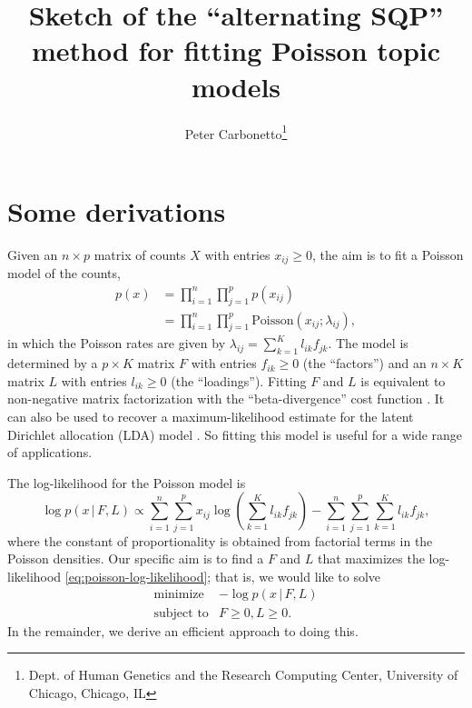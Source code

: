 \documentclass[final]{siamart171218}
\title{Sketch of the ``alternating SQP'' method for fitting Poisson
  topic models}
\author{Peter Carbonetto\thanks{Dept. of Human Genetics and the Research Computing Center, University of Chicago, Chicago, IL}}
\begin{document}
\maketitle

\section{Some derivations}

Given an $n \times p$ matrix of counts $X$ with entries $x_{ij} \geq
0$, the aim is to fit a Poisson model of the counts,
\begin{align}
p(x) &= \prod_{i=1}^n \prod_{j=1}^p p(x_{ij}) \nonumber \\
     &= \prod_{i=1}^n \prod_{j=1}^p \mathrm{Poisson}(x_{ij}; \lambda_{ij}),
\label{eq:poisson-likelihood}
\end{align}
in which the Poisson rates are given by $\lambda_{ij} = \sum_{k=1}^K
l_{ik} f_{jk}$. The model is determined by a $p \times K$ matrix $F$
with entries $f_{ik} \geq 0$ (the ``factors'') and an $n \times K$
matrix $L$ with entries $l_{ik} \geq 0$ (the ``loadings''). Fitting
$F$ and $L$ is equivalent to non-negative matrix factorization with
the ``beta-divergence'' cost function \cite{lee-2001}. It can also be
used to recover a maximum-likelihood estimate for the latent Dirichlet
allocation (LDA) model \cite{blei-2003}. So fitting this model is
useful for a wide range of applications.

The log-likelihood for the Poisson model is
\begin{equation}
\log p(x \,|\, F, L) \propto
  \sum_{i=1}^n \sum_{j=1}^p x_{ij} \log
  ({\textstyle \sum_{k=1}^K l_{ik} f_{jk}})
    - \sum_{i=1}^n \sum_{j=1}^p \sum_{k=1}^K l_{ik} f_{jk},
\label{eq:poisson-log-likelihood}
\end{equation}
where the constant of proportionality is obtained from factorial terms
in the Poisson densities. Our specific aim is to find a $F$ and $L$
that maximizes the log-likelihood \eqref{eq:poisson-log-likelihood};
that is, we would like to solve
\begin{equation}
\begin{array}{ll}
\mbox{minimize} & -\log p(x \,|\, F, L) \\
\mbox{subject to} & F \geq 0, L \geq 0.
\end{array}
\label{eq:problem}
\end{equation}
In the remainder, we derive an efficient approach to
doing this.
\end{document}
